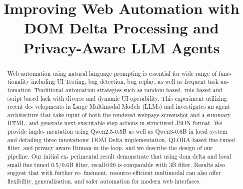 \documentclass[conference]{IEEEtran}
\begin{document}
\title{Improving Web Automation with DOM
Delta Processing and Privacy-Aware LLM
Agents\\
}

\author{
\and
{}
}

\maketitle

\begin{abstract}
Web automation using natural language prompting is essential for wide range of func- tionality including UI Testing, bug detection, bug replay, as well as frequent task au- tomation. Traditional automation strategies such as random based, rule based and script based lack with diverse and dynamic UI operability. This experiment utilizing recent de- velopments in Large Multimodal Models (LLMs) and investigates an agent architecture that take input of both the rendered webpage screenshot and a summary HTML, and generate next executable step actions in structured JSON format. We provide imple- mentation using Qwen2.5-0.5B as well as Qwen3-0.6B in local system and detailing three innovations: DOM Delta implementation, QLORA-based fine-tuned filter, and privacy aware Human-in-the-loop, and we describe the design of our pipeline. Our initial ex- perimental result demonstrate that using dom delta and local small fine tuned 0.5/0.6B filter, recall@20 is comparable with 3B filter. Results also suggest that with further re- finement, resource-efficient multimodal can also offer flexibility, generalization, and safer automation for modern web interfaces.
\end{abstract}













\end{document}
